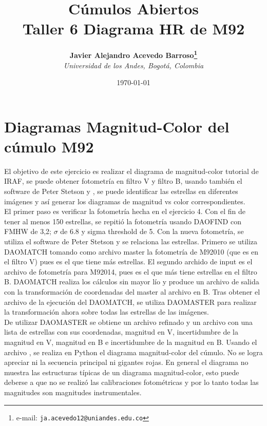 \documentclass[12pt]{article}
\begin{document}
\title{Cúmulos Abiertos \\ Taller 6 Diagrama HR de M92}

\author{
\textbf{Javier Alejandro Acevedo Barroso\thanks{e-mail: \texttt{ja.acevedo12@uniandes.edu.co}}}\\
\textit{Universidad de los Andes, Bogotá, Colombia}\\
 }%

\date{\today}
\maketitle %


\normalsize
\newpage




\section{Diagramas Magnitud-Color del cúmulo M92}
El objetivo de este ejercicio es realizar el diagrama de magnitud-color tutorial de IRAF, se puede obtener fotometría en filtro V y filtro B, usando también el software de Peter Stetson  y , se puede identificar las estrellas en diferentes imágenes y así generar los diagramas de magnitud vs color correspondientes.\\


El primer paso es verificar la fotometría hecha en el ejercicio 4. Con el fin de tener al menos 150 estrellas, se repitió la fotometría usando DAOFIND con FMHW de 3,2; $\sigma$ de 6.8 y sigma threshold de 5. Con la nueva fotometría, se utiliza el software de Peter Stetson y se relaciona las estrellas. Primero se utiliza DAOMATCH tomando como archivo master la fotometría de M92010 (que es en el filtro V) pues es el que tiene más estrellas. El segundo archido de input es el archivo de fotometría para M92014, pues es el que más tiene estrellas en el filtro B. DAOMATCH realiza los cálculos sin mayor lío y produce un archivo de salida con la transformación de coordenadas del master al archivo en B. Tras obtener el archivo  de la ejecución del DAOMATCH, se utiliza DAOMASTER para realizar la transformación ahora sobre todas las estrellas de las imágenes. \\


De utilizar DAOMASTER se obtiene un archivo  refinado y un archivo  con una lista de estrellas con sus coordenadas, magnitud en V, incertidumbre de la magnitud en V, magnitud en B e incertidumbre de la magnitud en B. Usando el archivo , se realiza en Python el diagrama magnitud-color del cúmulo. No se logra apreciar ni la secuencia principal ni gigantes rojas. En general el diagrama no muestra las estructuras típicas de un diagrama magnitud-color, esto puede deberse a que no se realizó las calibraciones fotométricas y por lo tanto todas las magnitudes son magnitudes instrumentales.\\
\end{document}
